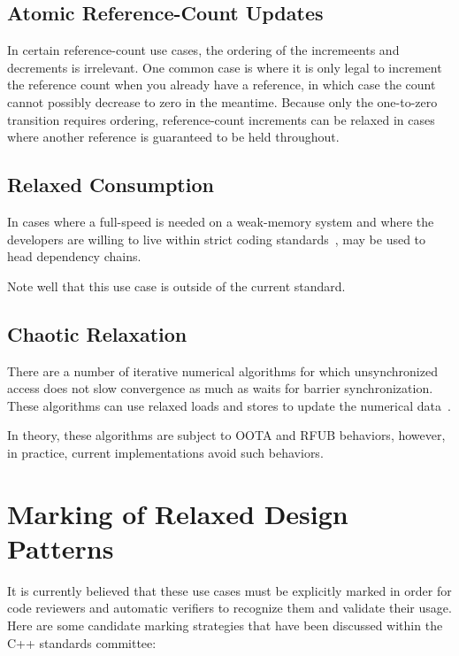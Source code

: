 \documentclass{article}
\begin{document}
\subsection{Atomic Reference-Count Updates}
\label{sec:Atomic Reference-Count Updates}

In certain reference-count use cases, the ordering of the incremeents and
decrements is irrelevant.
One common case is where it is only legal to increment the reference
count when you already have a reference, in which case the count cannot
possibly decrease to zero in the meantime.
Because only the one-to-zero transition requires ordering, reference-count
increments can be relaxed in cases where another reference is guaranteed
to be held throughout.

\subsection{Relaxed Consumption}
\label{sec:Relaxed Consumption}

In cases where a full-speed  is needed on a
weak-memory system and where the developers are willing to live within
strict coding standards~\cite{PaulEMcKenney2014rcu-dereference},
 may be used to head dependency chains.

Note well that this use case is outside of the current standard.

\subsection{Chaotic Relaxation}
\label{sec:Chaotic Relaxation}

There are a number of iterative numerical algorithms for which unsynchronized
access does not slow convergence as much as waits for barrier synchronization.
These algorithms can use relaxed loads and stores to update the numerical
data~\cite{Andrews91textbook}.

In theory, these algorithms are subject to OOTA and RFUB behaviors, however,
in practice, current implementations avoid such behaviors.

\section{Marking of Relaxed Design Patterns}
\label{sec:Marking of Relaxed Design Patterns}

It is currently believed that these use cases must be explicitly marked
in order for code reviewers and automatic verifiers to recognize them
and validate their usage.
Here are some candidate marking strategies that have been discussed
within the C++ standards committee:
\end{document}
